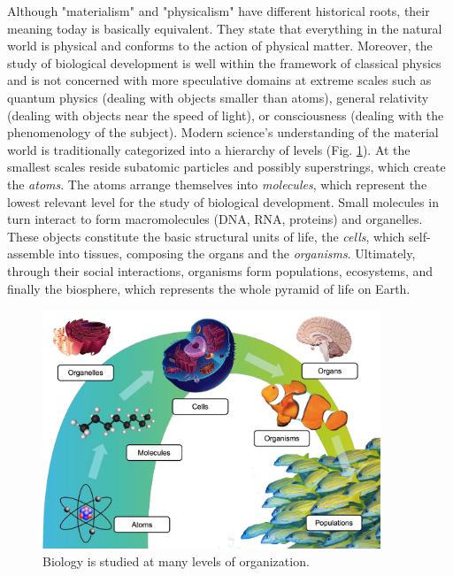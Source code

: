   Although "materialism" and "physicalism" have different historical roots, their meaning today is basically equivalent. They state that everything in the natural world is physical and conforms to the action of physical matter. Moreover, the study of biological development is well within the framework of classical physics and is not concerned with more speculative domains at extreme scales such as quantum physics (dealing with objects smaller than atoms), general relativity (dealing with objects near the speed of light), or consciousness (dealing with the phenomenology of the subject). Modern science's understanding of the material world is traditionally categorized into a hierarchy of levels (Fig. \ref{leveloforganization_circle}). At the smallest scales reside subatomic particles and possibly superstrings, which create the \textit{atoms}. The atoms arrange themselves into \textit{molecules}, which represent the lowest relevant level for the study of biological development. Small molecules in turn interact to form macromolecules (DNA, RNA, proteins) and organelles. These objects constitute the basic structural units of life, the \textit{cells}, which self-assemble into tissues, composing the organs and the \textit{organisms}. Ultimately, through their social interactions, organisms form populations, ecosystems, and finally the biosphere, which represents the whole pyramid of life on Earth.  
\begin{figure}
\begin{center}
\includegraphics[width=0.9\textwidth]{../../images/levels_of_organization/leveloforganization_circle2.png}
\end{center}
\caption{Biology is studied at many levels of organization.}
\label{leveloforganization_circle}
\end{figure}

